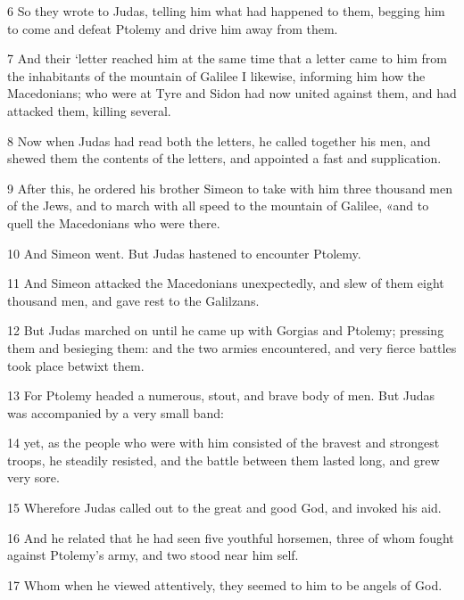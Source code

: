 \par 6 So they wrote to Judas, telling him what had happened to them, begging him to come and defeat Ptolemy and drive him away from them. 

\par 7 And their ‘letter reached him at the same time that a letter came to him from the inhabitants of the mountain of Galilee I likewise, informing him how the Macedonians; who were at Tyre and Sidon had now united against them, and had attacked them, killing several. 

\par 8 Now when Judas had read both the letters, he called together his men, and shewed them the contents of the letters, and appointed a fast and supplication. 

\par 9 After this, he ordered his brother Simeon to take with him three thousand men of the Jews, and to march with all speed to the mountain of Galilee, «and to quell the Macedonians who were there. 

\par 10 And Simeon went. But Judas hastened to encounter Ptolemy. 

\par 11 And Simeon attacked the Macedonians unexpectedly, and slew of them eight thousand men, and gave rest to the Galilzans. 

\par 12 But Judas marched on until he came up with Gorgias and Ptolemy; pressing them and besieging them: and the two armies encountered, and very fierce battles took place betwixt them. 

\par 13 For Ptolemy headed a numerous, stout, and brave body of men. But Judas was accompanied by a very small band: 

\par 14 yet, as the people who were with him consisted of the bravest and strongest troops, he steadily resisted, and the battle between them lasted long, and grew very sore. 

\par 15 Wherefore Judas called out to the great and good God, and invoked his aid. 

\par 16 And he related that he had seen five youthful horsemen, three of whom fought against Ptolemy’s army, and two stood near him self. 

\par 17 Whom when he viewed attentively, they seemed to him to be angels of God. 

